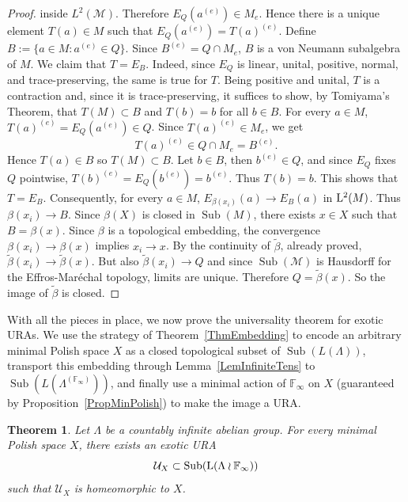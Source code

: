 \documentclass[12pt]{amsart} %
\theoremstyle{plain}
\newtheorem{theorem}{Theorem}[section]
\theoremstyle{definition}
\newcommand{\Ucal}{\mathcal{U}}
\DeclareMathOperator{\Sub}{Sub}
\begin{document}
\begin{proof}
inside \(L^2(\mathcal M)\). Therefore $E_Q(a^{(e)})\in M_e$. Hence there is a unique element \(T(a)\in M\) such that $E_Q(a^{(e)})=T(a)^{(e)}$. Define $B:=\{a\in M:a^{(e)}\in Q\}$. Since $B^{(e)}=Q\cap M_e$, \(B\) is a von Neumann subalgebra of \(M\). We claim that \(T=E_B\). Indeed, since \(E_Q\) is linear, unital, positive, normal, and trace-preserving, the same is true for \(T\). Being positive and unital, $T$ is a contraction and, since it is trace-preserving, it suffices to show, by Tomiyama's Theorem, that $T(M)\subset B$ and $T(b)=b$ for all $b\in B$. For every \(a\in M\), $T(a)^{(e)}=E_Q(a^{(e)})\in Q$.
Since \(T(a)^{(e)}\in M_e\), we get
\[
        T(a)^{(e)}\in Q\cap M_e=B^{(e)}.
\]
Hence $T(a)\in B$ so $T(M)\subset B$. Let \(b\in B\), then \(b^{(e)}\in Q\), and since \(E_Q\) fixes \(Q\)
pointwise, $T(b)^{(e)}=E_Q(b^{(e)})=b^{(e)}$. Thus $T(b)=b$. This shows that $T=E_B$. Consequently, for every \(a\in M\), $E_{\beta(x_i)}(a) \to E_B(a)$ in ${\rm L}^2(M)$. Thus $ \beta(x_i)\to B$.
Since \(\beta(X)\) is closed in \(\Sub(M)\), there exists \(x\in X\) such that $B=\beta(x)$. Since \(\beta\) is a topological embedding, the convergence $\beta(x_i)\to \beta(x)$ implies $ x_i\to x$. 
By the continuity of \(\widetilde\beta\), already proved, $\widetilde\beta(x_i)\to \widetilde\beta(x)$. But also $\widetilde\beta(x_i)\to Q$ and since \(\Sub(\mathcal M)\) is Hausdorff for the Effros-Mar\'echal topology, limits are
unique. Therefore $Q=\widetilde\beta(x)$. So the image of \(\widetilde\beta\) is closed.\end{proof}
With all the pieces in place, we now prove the universality theorem for exotic URAs. We use the strategy of Theorem~\ref{ThmEmbedding} to encode an arbitrary minimal Polish space $X$ as a closed topological subset of $\Sub(L(\Lambda))$, transport this embedding through Lemma~\ref{LemInfiniteTens} to $\Sub(L(\Lambda^{(\mathbb F_\infty)}))$, and finally use a minimal action of $\mathbb F_\infty$ on $X$ (guaranteed by Proposition~\ref{PropMinPolish}) to make the image a URA.
\begin{theorem}
\label{UniversalWreath}
Let \(\Lambda\) be a countably infinite abelian group. For every minimal Polish space \(X\), there exists an exotic
URA
$$\mathcal U_X\subset \Sub({\rm L}(\Lambda\wr \mathbb F_\infty))$$
such that $\Ucal_X$ is homeomorphic to $X$.
\end{theorem}
\end{document}
